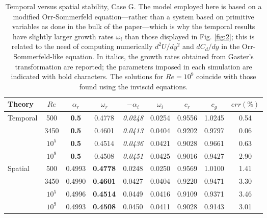 \begin{table}[H]
	\begin{center}
		\begin{tabular}{l|c|c|c|c|c|c|c|c}
			\hline 
			\hline
			Theory & $Re$ & $\alpha_r$ & $\omega_r$ & $-\alpha_i$ & $\omega_i$ & $c_r$ & $c_g$ & $err(\%)$ \\ 
			\hline 
			Temporal & 500 &\textbf{ 0.5}  & 0.4778 & \textit{0.0248} & 0.0254 & 0.9556 & 1.0245 & 0.54 \\ 
			
			& 3450 & \textbf{0.5}  & 0.4601 &\textit{ 0.0413} & 0.0404 & 0.9202 & 0.9797 & 0.06 \\ 
			
			& $10^5$ & \textbf{0.5 } & 0.4514 & \textit{0.0436} & 0.0421 & 0.9028 & 0.9661 & 0.63 \\ 
			
			& $10^9$ &\textbf{ 0.5}  & 0.4508 & \textit{0.0451} & 0.0425 & 0.9016 & 0.9427 & 2.90 \\ 
			
			Spatial & 500 & 0.4993 & \textbf{0.4778} & 0.0248 & 0.0250 & 0.9569 & 1.0100 & 1.41 \\ 
			
			& 3450 & 0.4990 & \textbf{0.4601} & 0.0427 & 0.0404 & 0.9220 & 0.9471  & 3.30 \\ 
			
			& $10^5$ & 0.4996 & \textbf{0.4514} & 0.0449 &  0.0416 & 0.9109 & 0.9371 & 3.46 \\ 
			
			& $10^9$ & 0.4993 & \textbf{0.4508} & 0.0450 & 0.0411 & 0.9028 & 0.9143 & 3.01 \\ 
			\hline 
			\hline
		\end{tabular} 
	\end{center}
	\label{tab:spa_tem}
	\caption{Temporal versus spatial stability, Case G. The model employed
		here is based on a modified Orr-Sommerfeld equation—rather than a system
		based on primitive variables as done in the bulk of the paper—which is
		why the temporal results have slightly larger growth rates $\omega_i$ than those
		displayed in Fig. \ref{fig:2}; this is related to the need of computing numerically
		$d^2 U /dy^2$ and $dC_d /dy$ in the Orr-Sommerfeld-like equation. In italics,
		the growth rates obtained from Gaster’s transformation are reported; the
		parameters imposed in each simulation are indicated with bold characters.
		The solutions for $Re = 10^9$ coincide with those found using the inviscid
		equations.}
\end{table}


